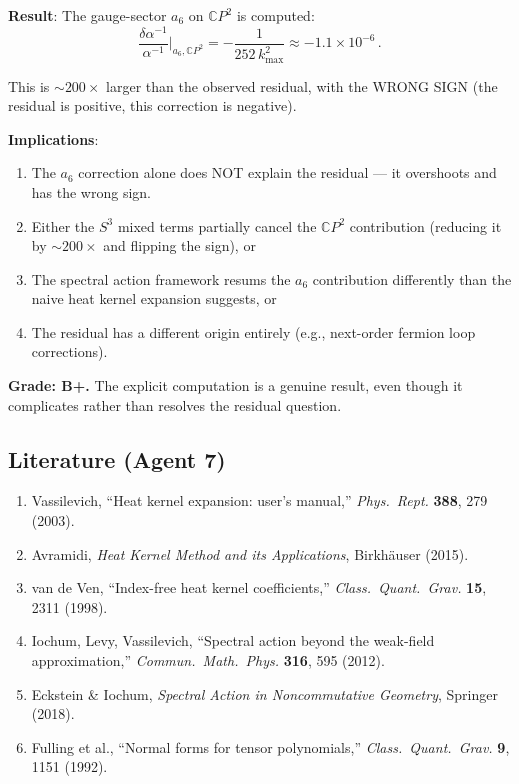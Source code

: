 \documentclass[11pt,a4paper]{article}
\newcommand{\CP}{\mathbb{C}P}
\begin{document}
\begin{tcolorbox}[colback=yellow!5!white, colframe=yellow!60!black, title={Agent 7: $a_6$ Explicit Computation}]
\textbf{Result}: The gauge-sector $a_6$ on $\CP^2$ is computed:
\begin{equation}
\frac{\delta\alpha^{-1}}{\alpha^{-1}}\bigg|_{a_6, \CP^2} = -\frac{1}{252\,k_{\max}^2} \approx -1.1 \times 10^{-6}\,.
\end{equation}

This is $\sim 200\times$ larger than the observed residual, with the WRONG SIGN (the residual is positive, this correction is negative).

\textbf{Implications}:
\begin{enumerate}
\item The $a_6$ correction alone does NOT explain the residual --- it overshoots and has the wrong sign.
\item Either the $S^3$ mixed terms partially cancel the $\CP^2$ contribution (reducing it by $\sim 200\times$ and flipping the sign), or
\item The spectral action framework resums the $a_6$ contribution differently than the naive heat kernel expansion suggests, or
\item The residual has a different origin entirely (e.g., next-order fermion loop corrections).
\end{enumerate}

\textbf{Grade: B+.} The explicit computation is a genuine result, even though it complicates rather than resolves the residual question.
\end{tcolorbox}

\subsection{Literature (Agent 7)}

\begin{enumerate}
\item Vassilevich, ``Heat kernel expansion: user's manual,'' \textit{Phys.\ Rept.} \textbf{388}, 279 (2003).
\item Avramidi, \textit{Heat Kernel Method and its Applications}, Birkh\"auser (2015).
\item van de Ven, ``Index-free heat kernel coefficients,'' \textit{Class.\ Quant.\ Grav.} \textbf{15}, 2311 (1998).
\item Iochum, Levy, Vassilevich, ``Spectral action beyond the weak-field approximation,'' \textit{Commun.\ Math.\ Phys.} \textbf{316}, 595 (2012).
\item Eckstein \& Iochum, \textit{Spectral Action in Noncommutative Geometry}, Springer (2018).
\item Fulling et al., ``Normal forms for tensor polynomials,'' \textit{Class.\ Quant.\ Grav.} \textbf{9}, 1151 (1992).
\end{enumerate}
\end{document}
